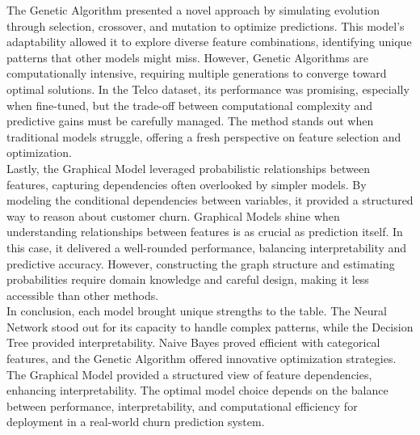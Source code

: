 The Genetic Algorithm presented a novel approach by simulating evolution through selection, crossover, and mutation to optimize predictions. This model's adaptability allowed it to explore diverse feature combinations, identifying unique patterns that other models might miss. However, Genetic Algorithms are computationally intensive, requiring multiple generations to converge toward optimal solutions. In the Telco dataset, its performance was promising, especially when fine-tuned, but the trade-off between computational complexity and predictive gains must be carefully managed. The method stands out when traditional models struggle, offering a fresh perspective on feature selection and optimization.\\

Lastly, the Graphical Model leveraged probabilistic relationships between features, capturing dependencies often overlooked by simpler models. By modeling the conditional dependencies between variables, it provided a structured way to reason about customer churn. Graphical Models shine when understanding relationships between features is as crucial as prediction itself. In this case, it delivered a well-rounded performance, balancing interpretability and predictive accuracy. However, constructing the graph structure and estimating probabilities require domain knowledge and careful design, making it less accessible than other methods.\\

In conclusion, each model brought unique strengths to the table. The Neural Network stood out for its capacity to handle complex patterns, while the Decision Tree provided interpretability. Naive Bayes proved efficient with categorical features, and the Genetic Algorithm offered innovative optimization strategies. The Graphical Model provided a structured view of feature dependencies, enhancing interpretability. The optimal model choice depends on the balance between performance, interpretability, and computational efficiency for deployment in a real-world churn prediction system.